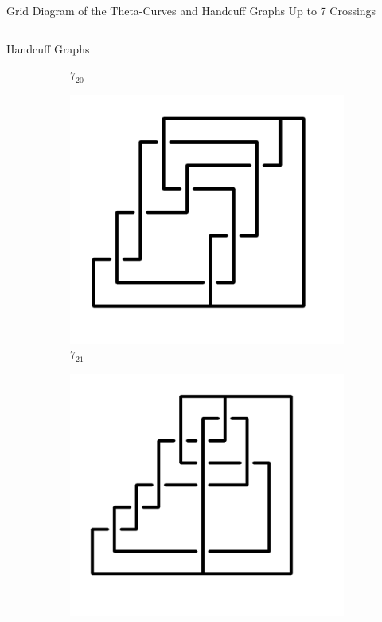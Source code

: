 \documentclass[final]{beamer}
\begin{document}
\begin{frame}[t]
\begin{alertblock}{Grid Diagram of the Theta-Curves and Handcuff Graphs Up to 7 Crossings}
\begin{columns}[t]
\begin{column}{0.5\textwidth}
\begin{alertblock}{Handcuff Graphs}
\begin{figure}
\begin{subfigure}{0.075\textwidth}
    \caption{$7_{20}$} 
    \end{subfigure}
    \begin{subfigure}{0.075\textwidth}
    \includegraphics[width=\columnwidth]{../Midterm_Poster/grid_diagram/handcuff_7_21.png}
    \caption{$7_{21}$} 
    \end{subfigure}
    \begin{subfigure}{0.075\textwidth}
    \includegraphics[width=\columnwidth]{../Midterm_Poster/grid_diagram/handcuff_7_22.png}

\end{subfigure}
\end{figure}
\end{alertblock}
\end{column}
\end{columns}
\end{alertblock}
\end{frame}
\end{document}
